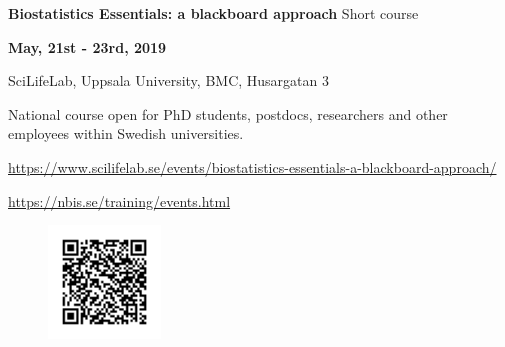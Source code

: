 \documentclass[12pt]{article}\usepackage[]{graphicx}\usepackage[]{color}
\begin{document}

\Huge
\textbf{Biostatistics Essentials: a blackboard approach} %
\normalsize
Short course

\LARGE
\vspace{1.5cm}
\begin{flushright} \textbf{May, 21st - 23rd, 2019} %

\normalsize
SciLifeLab, Uppsala University, BMC, Husargatan 3 %

\vspace{0.5cm}
National course open for PhD students, postdocs, researchers and other employees within Swedish universities.  

\normalsize
\vspace{0.5cm}
\href{https://www.scilifelab.se/events/biostatistics-essentials-a-blackboard-approach/}{https://www.scilifelab.se/events/biostatistics-essentials-a-blackboard-approach/}

\href{https://nbis.se/training/events.html}{https://nbis.se/training/events.html}
\end{flushright} 

\begin{figure}[H]
\includegraphics[width=3cm, height=3cm, right]{QR-code.png}
\end{figure}



\vspace{0.1cm}
\Large

\large
\vspace{0.2cm}
\end{document}
